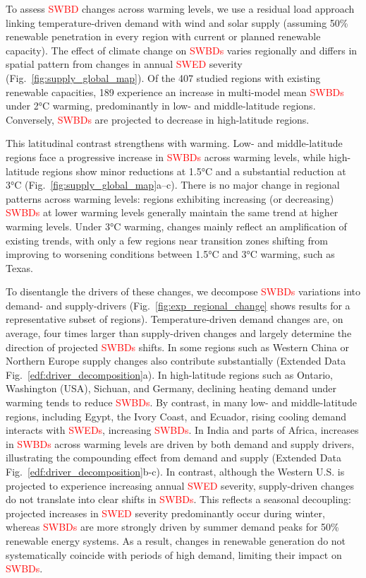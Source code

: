 \documentclass[pdflatex,sn-mathphys-num]{sn-jnl}%
\begin{document}
To assess \textcolor{red}{SWBD} changes across warming levels, we use a residual load approach linking temperature-driven demand with wind and solar supply (assuming 50\% renewable penetration in every region with current or planned renewable capacity). The effect of climate change on \textcolor{red}{SWBDs} varies regionally and differs in spatial pattern from changes in annual \textcolor{red}{SWED} severity (Fig.~\ref{fig:supply_global_map}). Of the 407 studied regions with existing renewable capacities, 189 experience an increase in multi-model mean \textcolor{red}{SWBDs} under 2°C warming, predominantly in low- and middle-latitude regions.  Conversely, \textcolor{red}{SWBDs} are projected to decrease in high-latitude regions.  

This latitudinal contrast strengthens with warming. Low- and middle-latitude regions face a progressive increase in \textcolor{red}{SWBDs} across warming levels, while high-latitude regions show minor reductions at 1.5°C and a substantial reduction at 3°C (Fig.~\ref{fig:supply_global_map}a–c). There is no major change in regional patterns across warming levels: regions exhibiting increasing (or decreasing) \textcolor{red}{SWBDs} at lower warming levels generally maintain the same trend at higher warming levels. Under 3°C warming, changes mainly reflect an amplification of existing trends, with only a few regions near transition zones shifting from improving to worsening conditions between 1.5°C and 3°C warming, such as Texas. 


To disentangle the drivers of these changes, we decompose \textcolor{red}{SWBDs} variations into demand- and supply-drivers (Fig.~\ref{fig:exp_regional_change} shows results for a representative subset of regions). Temperature-driven demand changes are, on average, four times larger than supply-driven changes and largely determine the direction of projected \textcolor{red}{SWBDs} shifts. In some regions such as Western China or Northern Europe supply changes also contribute substantially (Extended Data Fig.~\ref{edf:driver_decomposition}a). In high-latitude regions such as Ontario, Washington (USA), Sichuan, and Germany, declining heating demand under warming tends to reduce \textcolor{red}{SWBDs}. By contrast, in many low- and middle-latitude regions, including Egypt, the Ivory Coast, and Ecuador, rising cooling demand interacts with \textcolor{red}{SWEDs}, increasing \textcolor{red}{SWBDs}. In India and parts of Africa, increases in \textcolor{red}{SWBDs} across warming levels are driven by both demand and supply drivers, illustrating the compounding effect from demand and supply (Extended Data Fig.~\ref{edf:driver_decomposition}b-c). In contrast, although the Western U.S. is projected to experience increasing annual \textcolor{red}{SWED} severity, supply-driven changes do not translate into clear shifts in \textcolor{red}{SWBDs}. This reflects a seasonal decoupling: projected increases in \textcolor{red}{SWED} severity predominantly occur during winter, whereas \textcolor{red}{SWBDs} are more strongly driven by summer demand peaks for 50\% renewable energy systems. As a result, changes in renewable generation do not systematically coincide with periods of high demand, limiting their impact on \textcolor{red}{SWBDs}. 
\end{document}
